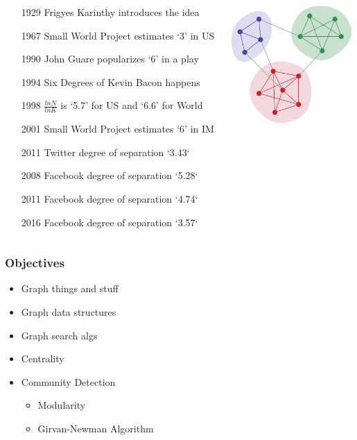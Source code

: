 \documentclass[xcolor={dvipsnames}]{beamer}
\begin{document}
{\begin{columns}
\begin{column}{.55\textwidth}
\scriptsize
\begin{itemize}
\item[1929] Frigyes Karinthy introduces the idea
\item[1967] Small World Project estimates `3' in US
\item[1990] John Guare popularizes `6' in a play 
\item[1994] Six Degrees of Kevin Bacon happens
\item[1998] $\frac{ln N}{ln K}$ is `5.7' for US and `6.6' for World
\item[2001] Small World Project estimates `6' in IM
\item[2011] Twitter degree of separation `3.43`
\item[2008] Facebook degree of separation `5.28`	
\item[2011] Facebook degree of separation `4.74`	
\item[2016] Facebook degree of separation `3.57`	 
\end{itemize} 
\end{column}
\begin{column}{.5\textwidth}
\includegraphics[width=1.8in]{stuff/communities.jpg}
\end{column}
\end{columns}


}


\frame
{
\frametitle{Objectives}

\LARGE
\begin{itemize}
\item Graph things and stuff
\item Graph data structures
\item Graph search algs
\item[]
\item Centrality
\item Community Detection
\begin{itemize}
\Large
\item Modularity
\item Girvan-Newman Algorithm
\end{itemize}
\end{itemize}
}
\end{document}
